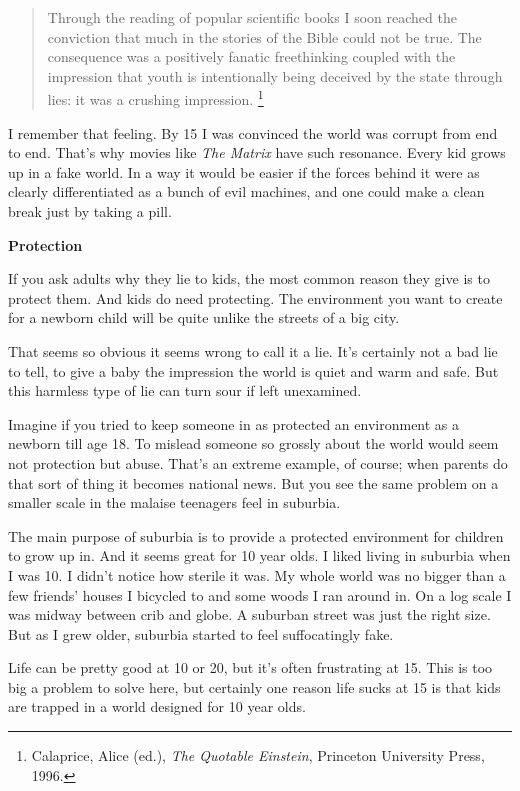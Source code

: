 \documentclass[12pt]{book}
\begin{document}
\begin{quote}
Through the reading of popular scientific books I soon reached the
conviction that much in the stories of the Bible could not be true. The
consequence was a positively fanatic freethinking coupled with the
impression that youth is intentionally being deceived by the state
through lies: it was a crushing impression. \footnote{Calaprice, Alice (ed.), \emph{The Quotable Einstein}, Princeton
University Press, 1996.}
\end{quote}

I remember that feeling. By 15 I was convinced the world was corrupt
from end to end. That's why movies like \emph{The Matrix} have such
resonance. Every kid grows up in a fake world. In a way it would be
easier if the forces behind it were as clearly differentiated as a bunch
of evil machines, and one could make a clean break just by taking a
pill.

\textbf{Protection}

If you ask adults why they lie to kids, the most common reason they give
is to protect them. And kids do need protecting. The environment you
want to create for a newborn child will be quite unlike the streets of a
big city.

That seems so obvious it seems wrong to call it a lie. It's certainly
not a bad lie to tell, to give a baby the impression the world is quiet
and warm and safe. But this harmless type of lie can turn sour if left
unexamined.

Imagine if you tried to keep someone in as protected an environment as a
newborn till age 18. To mislead someone so grossly about the world would
seem not protection but abuse. That's an extreme example, of course;
when parents do that sort of thing it becomes national news. But you see
the same problem on a smaller scale in the malaise teenagers feel in
suburbia.

The main purpose of suburbia is to provide a protected environment for
children to grow up in. And it seems great for 10 year olds. I liked
living in suburbia when I was 10. I didn't notice how sterile it was. My
whole world was no bigger than a few friends' houses I bicycled to and
some woods I ran around in. On a log scale I was midway between crib and
globe. A suburban street was just the right size. But as I grew older,
suburbia started to feel suffocatingly fake.

Life can be pretty good at 10 or 20, but it's often frustrating at 15.
This is too big a problem to solve here, but certainly one reason life
sucks at 15 is that kids are trapped in a world designed for 10 year
olds.
\end{document}
